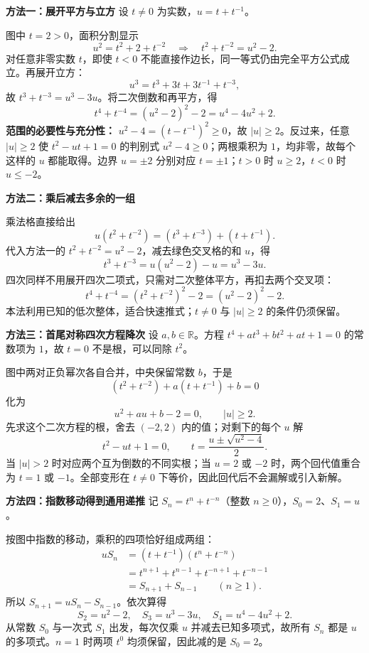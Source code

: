 \begin{proofbox}
\textbf{\textcolor{CProof}{方法一：展开平方与立方}}
设 $t\ne0$ 为实数，$u=t+t^{-1}$。

图中 $t=2>0$，面积分割显示
\[
u^2=t^2+2+t^{-2}\quad\Longrightarrow\quad t^2+t^{-2}=u^2-2.
\]
对任意非零实数 $t$，即使 $t<0$ 不能直接作边长，同一等式仍由完全平方公式成立。再展开立方：
\[
u^3=t^3+3t+3t^{-1}+t^{-3},
\]
故 $t^3+t^{-3}=u^3-3u$。将二次倒数和再平方，得
\[
t^4+t^{-4}=(u^2-2)^2-2=u^4-4u^2+2.
\]
\textbf{范围的必要性与充分性：}
$u^2-4=(t-t^{-1})^2\ge0$，故 $|u|\ge2$。反过来，任意 $|u|\ge2$ 使 $t^2-ut+1=0$ 的判别式 $u^2-4\ge0$；两根乘积为 $1$，均非零，故每个这样的 $u$ 都能取得。边界 $u=\pm2$ 分别对应 $t=\pm1$；$t>0$ 时 $u\ge2$，$t<0$ 时 $u\le-2$。
\end{proofbox}
\clearpage
\begin{proofbox}
\textbf{\textcolor{CProof}{方法二：乘后减去多余的一组}}

乘法格直接给出
\[
u(t^2+t^{-2})=(t^3+t^{-3})+(t+t^{-1}).
\]
代入方法一的 $t^2+t^{-2}=u^2-2$，减去绿色交叉格的和 $u$，得
\[
\boxed{t^3+t^{-3}=u(u^2-2)-u=u^3-3u.}
\]
四次同样不用展开四次二项式，只需对二次整体平方，再扣去两个交叉项：
\[
\boxed{t^4+t^{-4}=(t^2+t^{-2})^2-2=(u^2-2)^2-2.}
\]
本法利用已知的低次整体，适合快速推式；$t\ne0$ 与 $|u|\ge2$ 的条件仍须保留。
\end{proofbox}
\clearpage
\begin{proofbox}
\textbf{\textcolor{CProof}{方法三：首尾对称四次方程降次}}
设 $a,b\in\mathbb R$。方程 $t^4+at^3+bt^2+at+1=0$ 的常数项为 $1$，故 $t=0$ 不是根，可以同除 $t^2$。

图中两对正负幂次各自合并，中央保留常数 $b$，于是
\[
(t^2+t^{-2})+a(t+t^{-1})+b=0
\]
化为
\[
\boxed{u^2+au+b-2=0,\qquad |u|\ge2.}
\]
先求这个二次方程的根，舍去 $(-2,2)$ 内的值；对剩下的每个 $u$ 解
\[
t^2-ut+1=0,\qquad t=\frac{u\pm\sqrt{u^2-4}}2.
\]
当 $|u|>2$ 时对应两个互为倒数的不同实根；当 $u=2$ 或 $-2$ 时，两个回代值重合为 $t=1$ 或 $-1$。全部变形在 $t\ne0$ 下等价，因此回代后不会漏解或引入新解。
\end{proofbox}
\clearpage
\begin{proofbox}
\textbf{\textcolor{CProof}{方法四：指数移动得到通用递推}}
记 $S_n=t^n+t^{-n}$（整数 $n\ge0$），$S_0=2$、$S_1=u$。

按图中指数的移动，乘积的四项恰好组成两组：
\[
\begin{aligned}
uS_n&=(t+t^{-1})(t^n+t^{-n})\\
&=t^{n+1}+t^{n-1}+t^{-n+1}+t^{-n-1}\\
&=S_{n+1}+S_{n-1}\qquad(n\ge1).
\end{aligned}
\]
所以 $\boxed{S_{n+1}=uS_n-S_{n-1}}$。依次算得
\[
S_2=u^2-2,\quad S_3=u^3-3u,\quad S_4=u^4-4u^2+2.
\]
从常数 $S_0$ 与一次式 $S_1$ 出发，每次仅乘 $u$ 并减去已知多项式，故所有 $S_n$ 都是 $u$ 的多项式。$n=1$ 时两项 $t^0$ 均须保留，因此减的是 $S_0=2$。
\end{proofbox}
